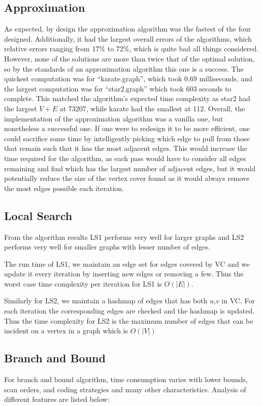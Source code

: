 \subsection{Approximation}
As expected, by design the approximation algorithm was the fastest of the four designed. 
Additionally, it had the largest overall errors of the algorithms, which relative errors ranging from 17\% to 72\%, which is quite bad all things considered. 
However, none of the solutions are more than twice that of the optimal solution, so by the standards of an approximation algorithm this one is a success. 
The quickest computation was for ``karate.graph'', which took 0.69 milliseconds, and the largest computation was for ``star2.graph'' which took 603 seconds to complete.
This matched the algorithm's expected time complexity as star2 had the largest $V + E$ at 73207, while karate had the smallest at 112.  
Overall, the implementation of the approximation algorithm was a vanilla one, but nonetheless a successful one.
If one were to redesign it to be more efficient, one could sacrifice some time by intelligently picking which edge to pull from those that remain such that it has the most adjacent edges. 
This would increase the time required for the algorithm, as each pass would have to consider all edges remaining and find which has the largest number of adjacent edges, but it would potentially reduce the size of the vertex cover found as it would always remove the most edges possible each iteration. 
\subsection{Local Search}
From the algorithm results LS1 performs very well for larger graphs and LS2 performs very well for smaller graphs with lesser number of edges.

The run time of LS1, we maintain an edge set for edges covered by VC and we update it every iteration by inserting new edges or removing a few. Thus the worst case time complexity per iteration for LS1 is $O(|E|)$.

Similarly for LS2, we maintain a hashmap of edges that has both $u$,$v$  in VC. For each iteration the corresponding edges are checked and the hashmap is updated. Thus the time complexity for LS2 is the maximum number of edges that can be incident on a vertex in a graph which is $O(|V|)$

\subsection{Branch and Bound}
For branch and bound algorithm, time consumption varies with lower bounds, scan orders, and coding strategies and many other characteristics. Analysis of different features are listed below:
